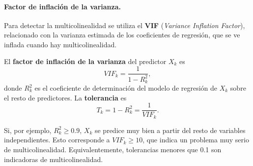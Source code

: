\paragraph{Factor de inflación de la varianza.} Para detectar la multicolinealidad se utiliza el
\textbf{VIF} (\emph{Variance Inflation Factor}), relacionado con la varianza estimada de los
coeficientes de regresión, que se ve inflada cuando hay multicolinealidad.

\begin{definicion}
  El \textbf{factor de inflación de la varianza} del predictor $X_k$ es
  \[
    VIF_k = \frac{1}{1-R_k^2},
  \]
  donde $R_k^2$ es el coeficiente de determinación del modelo de regresión de $X_k$ sobre el
  resto de predictores. La \textbf{tolerancia} es
  \[
    T_k = 1-R_k^2 = \frac{1}{VIF_k}.
  \]
\end{definicion}

Si, por ejemplo, $R_k^2\ge0.9$, $X_k$ se predice muy bien a partir del resto de variables
independientes. Esto corresponde a $VIF_k\ge10$, que indica un problema muy serio de
multicolinealidad. Equivalentemente, tolerancias menores que 0.1 son indicadoras de
multicolinealidad.
